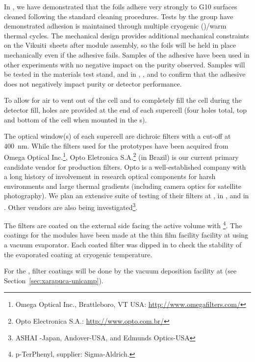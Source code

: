 In , we have demonstrated that the foils adhere very strongly to \frfour G10 surfaces cleaned following the  standard cleaning procedures.  Tests by the  group have demonstrated adhesion is maintained through multiple cryogenic ()/warm thermal cycles.  The mechanical design provides additional mechanical constraints on the Vikuiti\texttrademark\ sheets after module assembly, so the foils will be held in place mechanically even if the adhesive fails.  Samples of the adhesive have been used in other experiments with no negative impact on the  purity observed.  Samples will be tested in the  materials test stand, and in , , and  to confirm that the adhesive does not negatively impact  purity or detector performance.

To allow for air to vent out of the cell and  to completely fill the cell during the detector fill, holes are provided at the end of each supercell (four holes total, top and bottom of the cell when mounted in the s).

The optical window(s) of each supercell are dichroic filters with a cut-off at \SI{400}{nm}. While the filters used for the  prototypes have been acquired from Omega Optical Inc.\footnote{Omega Optical Inc., Brattleboro, VT USA: \url{http://www.omegafilters.com/}}, Opto Eletronica S.A.\footnote{Opto Electronica S.A.: \url{http://www.opto.com.br/}} (in Brazil) is our current primary candidate vendor for  production filters.  Opto is a well-established company with a long history of involvement in research optical components for harsh environments and large thermal gradients (including camera optics for satellite photography).  We plan an extensive suite of testing of their filters at , in , and in . Other vendors are also being investigated\footnote{ASHAI -Japan, Andover-USA, and Edmunds Optics-USA}.

The filters are coated on the external side facing the  active volume with \footnote{p-TerPhenyl, supplier: Sigma-Aldrich\textregistered.}.  The coatings for the  modules have been made at the thin film facility facility at  using a vacuum evaporator. Each coated filter was dipped in  to check the stability of the evaporated coating at cryogenic temperature. 

For the , filter coatings will be done by the vacuum deposition facility at  (see Section~\ref{sec:xarapuca-unicamp}).

